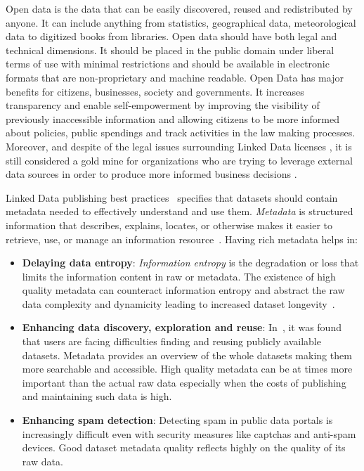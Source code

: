 \documentclass[runningheads,a4paper]{llncs}
\begin{document}
Open data is the data that can be easily discovered, reused and redistributed by anyone. It can include anything from statistics, geographical data, meteorological data to digitized books from libraries. Open data should have both legal and technical dimensions. It should be placed in the public domain under liberal terms of use with minimal restrictions and should be available in electronic formats that are non-proprietary and machine readable. Open Data has major benefits for citizens, businesses, society and governments. It increases transparency and enable self-empowerment by improving the visibility of previously inaccessible information and allowing citizens to be more informed about policies, public spendings and track activities in the law making processes. Moreover, and despite of the legal issues surrounding Linked Data licenses \cite{nomoneyLOD}, it is still considered a gold mine for organizations who are trying to leverage external data sources in order to produce more informed business decisions \cite{Boyd2011}.

Linked Data publishing best practices~\cite{Bizer:2011:EWG:2075914.2075915} specifies that datasets should contain metadata needed to effectively understand and use them. \textit{Metadata} is structured information that describes, explains, locates, or otherwise makes it easier to retrieve, use, or manage an information resource~\cite{NISO:04}. Having rich metadata helps in:

\begin{itemize}
  \item \textbf{Delaying data entropy}: \textit{Information entropy} is the degradation or loss that limits the information content in raw or metadata. The existence of high quality metadata can counteract information entropy and abstract the raw data complexity and dynamicity leading to  increased dataset longevity~\cite{GTOS}.
  \item \textbf{Enhancing data discovery, exploration and reuse}: In~\cite{Graham:11}, it was found that users are facing difficulties finding and reusing publicly available datasets. Metadata provides an overview of the whole datasets making them more searchable and accessible. High quality metadata can be at times more important than the actual raw data especially when the costs of publishing and maintaining such data is high.
  \item \textbf{Enhancing spam detection}: Detecting spam in public data portals is increasingly difficult  even with security measures like captchas and anti-spam devices. Good dataset metadata quality reflects highly on the quality of its raw data.
\end{itemize}
\end{document}
